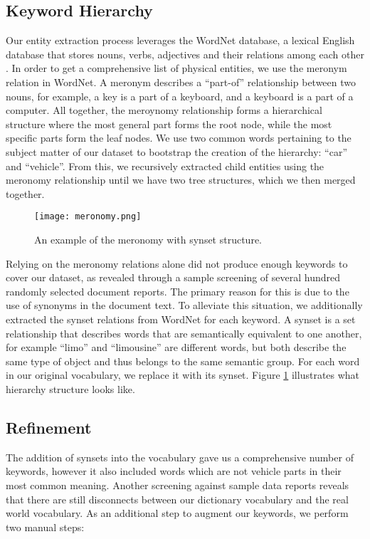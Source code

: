 \subsection{Keyword Hierarchy}
Our entity extraction process leverages the WordNet database, a lexical English
database that stores nouns, verbs, adjectives and their relations among each
other \cite{WORDNET}. In order to get a comprehensive list of physical entities, we use the meronym 
relation in WordNet. A meronym describes a ``part-of'' relationship between two 
nouns, for example, a key is a part of a keyboard, and a keyboard is a part of a computer. 
All together, the meroynomy relationship forms a hierarchical 
structure where the most general part forms the root node, while the most specific 
parts form the leaf nodes. We use two common words pertaining to the subject
matter of our dataset to bootstrap the creation of the hierarchy:
``car'' and ``vehicle''. From this, we recursively extracted child entities
using the meronomy relationship until we have two tree structures, which we then
merged together.

	\begin{figure}
	   \centering  
	   \texttt{[image: meronomy.png]}
	   \caption{An example of the meronomy with synset structure.}
	   \label{figure:meronomy}
	\end{figure}


Relying on the meronomy relations alone did not produce enough keywords to cover 
our dataset, as revealed through a sample screening of several hundred randomly 
selected document reports. The primary reason for this is due to the use of synonyms
in the document text. To alleviate this situation, we additionally extracted
the synset relations from WordNet for each keyword. A synset is a set
relationship that describes words that are semantically equivalent to one
another, for example ``limo'' and ``limousine'' are different words, but both
describe the same type of object and thus belongs to the same semantic group.
For each word in our original vocabulary, we replace it with its synset. Figure
\ref{figure:meronomy} illustrates what hierarchy structure looks like.




\subsection{Refinement}
The addition of synsets into the vocabulary gave us a comprehensive number of
keywords, however it also included words which are not vehicle parts in their most
common meaning. Another screening against sample data reports reveals that there are 
still disconnects between our dictionary vocabulary and the real world vocabulary.
As an additional step to augment our keywords, we perform two manual steps:

